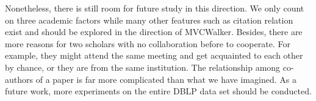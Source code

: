 \documentclass[10pt,journal,compsoc]{IEEEtran}
\begin{document}
Nonetheless, there is still room for future study in this direction. We only count on three academic factors while many other features such as citation relation exist and should be explored in the direction of MVCWalker. Besides, there are more reasons for two scholars with no collaboration before to cooperate. For example, they might attend the same meeting and get acquainted to each other by chance, or they are from the same institution. The relationship among co-authors of a paper is far more complicated than what we have imagined. As a future work, more experiments on the entire DBLP data set should be conducted.

%


\ifCLASSOPTIONcaptionsoff
  \newpage
\fi



%






\end{document}
